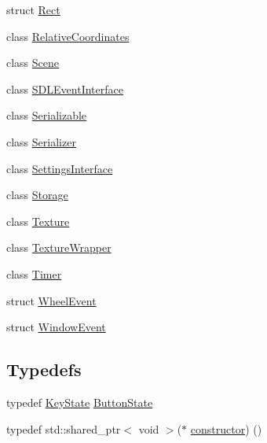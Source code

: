 \begin{DoxyCompactItemize}
struct \hyperlink{structbkengine_1_1Rect}{Rect}
\item 
class \hyperlink{classbkengine_1_1RelativeCoordinates}{Relative\+Coordinates}
\item 
class \hyperlink{classbkengine_1_1Scene}{Scene}
\item 
class \hyperlink{classbkengine_1_1SDLEventInterface}{S\+D\+L\+Event\+Interface}
\item 
class \hyperlink{classbkengine_1_1Serializable}{Serializable}
\item 
class \hyperlink{classbkengine_1_1Serializer}{Serializer}
\item 
class \hyperlink{classbkengine_1_1SettingsInterface}{Settings\+Interface}
\item 
class \hyperlink{classbkengine_1_1Storage}{Storage}
\item 
class \hyperlink{classbkengine_1_1Texture}{Texture}
\item 
class \hyperlink{classbkengine_1_1TextureWrapper}{Texture\+Wrapper}
\item 
class \hyperlink{classbkengine_1_1Timer}{Timer}
\item 
struct \hyperlink{structbkengine_1_1WheelEvent}{Wheel\+Event}
\item 
struct \hyperlink{structbkengine_1_1WindowEvent}{Window\+Event}
\end{DoxyCompactItemize}
\subsection*{Typedefs}
\begin{DoxyCompactItemize}
\item 
typedef \hyperlink{namespacebkengine_a98437a3b234dfae2c61231b4737d0834}{Key\+State} \hyperlink{namespacebkengine_a205072b2a91b1d8f00890857eec156d1}{Button\+State}
\item 
typedef std\+::shared\+\_\+ptr$<$ void $>$($\ast$ \hyperlink{namespacebkengine_acd14584baee16a048e3d8ec97780af46}{constructor}) ()
\end{DoxyCompactItemize}

